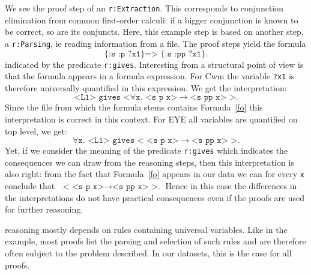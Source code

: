We see the proof step of an \texttt{r:Extraction}. This corresponds to conjunction elimination from common first-order calculi: 
if a bigger conjunction is known 
to be correct, so are its conjuncts. %
Here, this example step 
is based on another step, a \texttt{r:Parsing}, ie reading information from a file.  
The proof steps yield the formula \begin{equation}\texttt{\{:s :p ?x1\} => \{:s :pp ?x1\}.}\label{fo}\end{equation} indicated by the predicate \texttt{r:gives}. 
Interesting from a structural point of view is  
that the formula appears in a formula expression.  For Cwm the variable \texttt{?x1} is therefore universally quantified in this expression. We get the interpretation:
\[
 \texttt{<L1> gives <}\forall \texttt{x. <s p x>}\rightarrow\texttt{<s pp x> >.}
\]
Since the file from which the formula stems contains Formula~\ref{fo} this interpretation is correct in this context. For 
EYE all variables are quantified on top level,  we get: %
\[
\forall \texttt{x. <L1> gives < <s p x>}\rightarrow\texttt{<s pp x> >.}
\]
Yet, if we consider the meaning of the predicate \texttt{r:gives} which indicates the consequences we can draw from the reasoning steps, then this interpretation is also right:
from the fact that Formula~\ref{fo} appears in our data we can for every \texttt{x} conclude that $\texttt{ < <s p x>}\rightarrow\texttt{<s pp x> >.}$ 
Hence in this case the differences 
in the interpretations do not have practical consequences even if the proofs are used for further reasoning.

\nthree reasoning mostly depends on rules containing universal variables. Like in the example, most proofs list the parsing and selection of such rules and 
are therefore often
subject to the problem described. In our datasets, this is the case for all proofs. 

% 
% 
